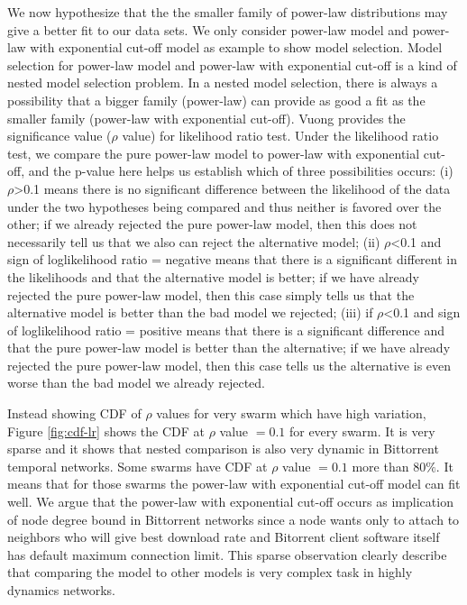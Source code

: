 \documentclass[10pt,conference,letterpaper]{IEEEtran}
\begin{document}
We now hypothesize that the the smaller family of power-law distributions may give a better fit to our data sets. 
We only consider power-law model and power-law with exponential cut-off model as example to show model selection.
Model selection for power-law model and power-law with exponential cut-off is a kind of nested model selection problem. 
In a nested model selection,  there is always a possibility that a bigger family (power-law) can provide as good a fit as the smaller family (power-law with exponential cut-off). 
Vuong \cite{vuong1989likelihood} provides the significance value ($\rho$ value) for likelihood ratio test. 
Under the likelihood ratio test, we compare the pure power-law model to power-law with exponential cut-off, and the p-value here helps us establish which of three possibilities occurs: (i) $\rho$>0.1 means there is no significant difference between the likelihood of the data under the two hypotheses being compared and thus neither is favored over the other; if we already rejected the pure power-law model, then this does not necessarily tell us that we also can reject the alternative model; (ii) $\rho$<0.1 and sign of loglikelihood ratio = negative means that there is a significant different in the likelihoods and that the alternative model is better; if we have already rejected the pure power-law model, then this case simply tells us that the alternative model is better than the bad model we rejected; (iii) if $\rho$<0.1 and sign of loglikelihood ratio = positive means that there is a significant difference and that the pure power-law model is better than the alternative; if we have already rejected the pure power-law model, then this case tells us the alternative is even worse than the bad model we already rejected.

Instead showing CDF of $\rho$ values for very swarm which have high variation, Figure \ref{fig:cdf-lr} shows the CDF at $\rho$ value $=0.1$ for every swarm. 
It is very sparse and it shows that nested comparison is also very dynamic in Bittorrent temporal networks.
Some swarms have CDF at $\rho$ value $=0.1$ more than $80\%$.
It means that for those swarms the power-law with exponential cut-off model can fit well.
We argue that the power-law with exponential cut-off occurs as implication of node degree bound in Bittorrent networks since a node wants only to attach to neighbors who will give best download rate and Bitorrent client software itself has default maximum connection limit.
This sparse observation clearly describe that comparing the model to other models is very complex task in highly dynamics networks.
\end{document}
